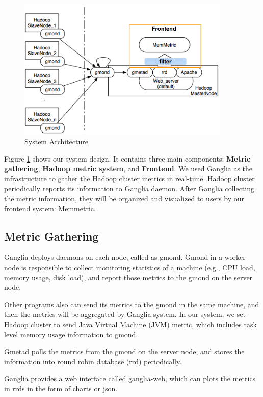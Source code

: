 \begin{figure}[ht]
  \centering
    \includegraphics[width=4.0in]{image/architecture.png}
    \caption{System Architecture}
    \label{ref:architecture}
\end{figure}

Figure \ref{ref:architecture} shows our system design. It contains three main components: \textbf{Metric gathering}, \textbf{Hadoop metric system}, and \textbf{Frontend}. We used Ganglia as the infrastructure to gather the  Hadoop cluster metrics in real-time. Hadoop cluster periodically reports its information to Ganglia daemon. After Ganglia collecting the metric information, they will be organized and visualized to users by our frontend system: Memmetric.

\subsection{Metric Gathering}

Ganglia deploys daemons on each node, called as gmond. Gmond in a worker node is responsible to collect monitoring statistics of a machine (e.g., CPU load, memory usage, disk load), and report those metrics to the gmond on the server node. 

Other programs also can send its metrics to the gmond in the same machine, and then the metrics will be aggregated by Ganglia system. In our system, we set Hadoop cluster to send Java Virtual Machine (JVM) metric, which includes task level memory usage information to gmond.

Gmetad polls the metrics from the gmond on the server node, and stores the information into round robin database (rrd) periodically. 

Ganglia provides a web interface called ganglia-web, which can plots the metrics in rrds in the form of charts or json. 

